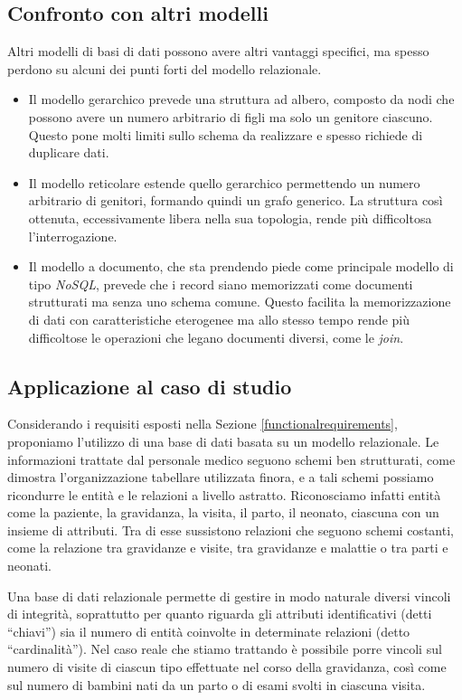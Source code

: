 \subsection{Confronto con altri modelli}

Altri modelli di basi di dati possono avere altri vantaggi specifici, ma spesso perdono su alcuni dei punti forti del modello relazionale.
\begin{itemize}
\item Il modello gerarchico prevede una struttura ad albero, composto da nodi che possono avere un numero arbitrario di figli ma solo un genitore ciascuno. Questo pone molti limiti sullo schema da realizzare e spesso richiede di duplicare dati.
\item Il modello reticolare estende quello gerarchico permettendo un numero arbitrario di genitori, formando quindi un grafo generico. La struttura così ottenuta, eccessivamente libera nella sua topologia, rende più difficoltosa l'interrogazione.
\item Il modello a documento, che sta prendendo piede come principale modello di tipo \emph{NoSQL}, prevede che i record siano memorizzati come documenti strutturati ma senza uno schema comune. Questo facilita la memorizzazione di dati con caratteristiche eterogenee ma allo stesso tempo rende più difficoltose le operazioni che legano documenti diversi, come le \emph{join}.
\end{itemize}

\subsection{Applicazione al caso di studio}

Considerando i requisiti esposti nella Sezione \ref{functionalrequirements}, proponiamo l'utilizzo di una base di dati basata su un modello relazionale.
Le informazioni trattate dal personale medico seguono schemi ben strutturati, come dimostra l'organizzazione tabellare utilizzata finora, e a tali schemi possiamo ricondurre le entità e le relazioni a livello astratto.
Riconosciamo infatti entità come la paziente, la gravidanza, la visita, il parto, il neonato, ciascuna con un insieme di attributi.
Tra di esse sussistono relazioni che seguono schemi costanti, come la relazione tra gravidanze e visite, tra gravidanze e malattie o tra parti e neonati.

Una base di dati relazionale permette di gestire in modo naturale diversi vincoli di integrità, soprattutto per quanto riguarda gli attributi identificativi (detti \enquote{chiavi}) sia il numero di entità coinvolte in determinate relazioni (detto \enquote{cardinalità}).
Nel caso reale che stiamo trattando è possibile porre vincoli sul numero di visite di ciascun tipo effettuate nel corso della gravidanza, così come sul numero di bambini nati da un parto o di esami svolti in ciascuna visita.

